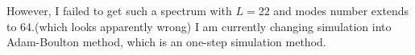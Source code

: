 \begin{description}
However, I failed to get such a spectrum with \(L = 22\) and modes number extends to 64.(which looks apparently wrong) I am currently changing simulation into Adam-Boulton method, which is an one-step simulation method.



\end{description}

\renewcommand{\ssp}{a}
